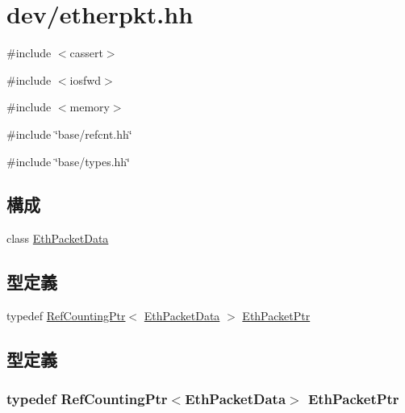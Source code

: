 \hypertarget{etherpkt_8hh}{
\section{dev/etherpkt.hh}
\label{etherpkt_8hh}
}
{\ttfamily \#include $<$cassert$>$}\par
{\ttfamily \#include $<$iosfwd$>$}\par
{\ttfamily \#include $<$memory$>$}\par
{\ttfamily \#include \char`\"{}base/refcnt.hh\char`\"{}}\par
{\ttfamily \#include \char`\"{}base/types.hh\char`\"{}}\par
\subsection*{構成}
\begin{DoxyCompactItemize}
\item 
class \hyperlink{classEthPacketData}{EthPacketData}
\end{DoxyCompactItemize}
\subsection*{型定義}
\begin{DoxyCompactItemize}
\item 
typedef \hyperlink{classRefCountingPtr}{RefCountingPtr}$<$ \hyperlink{classEthPacketData}{EthPacketData} $>$ \hyperlink{etherpkt_8hh_ab8215fc2a80eec44898e4832b840b537}{EthPacketPtr}
\end{DoxyCompactItemize}


\subsection{型定義}
\hypertarget{etherpkt_8hh_ab8215fc2a80eec44898e4832b840b537}{
\subsubsection[{EthPacketPtr}]{\setlength{\rightskip}{0pt plus 5cm}typedef {\bf RefCountingPtr}$<${\bf EthPacketData}$>$ {\bf EthPacketPtr}}}
\label{etherpkt_8hh_ab8215fc2a80eec44898e4832b840b537}
